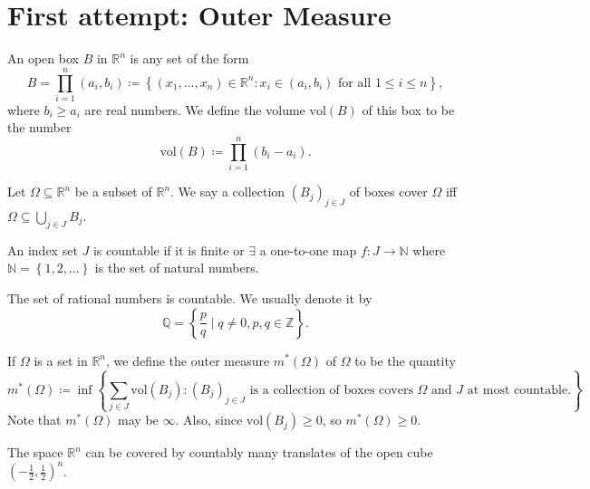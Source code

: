 \section{First attempt: Outer Measure}
\begin{definition}
    An open box \(B\) in \(\mathbb{R} ^n\) is any set of the form 
    \[
        B = \prod _{i=1}^n (a_i, b_i) \coloneqq \left\{ (x_1, \dots , x_n) \in \mathbb{R} ^n : x_i \in (a_i, b_i) \text{ for all } 1 \le i \le n  \right\},
    \]  
    where \(b_i \ge a_i\) are real numbers. We define the volume \(\mathrm{vol} (B) \) of this box to be the number 
    \[
        \mathrm{vol} (B) \coloneqq \prod _{i=1}^n (b_i - a_i). 
    \]   
\end{definition}

\begin{definition}
    Let \(\Omega \subseteq \mathbb{R} ^n\) be a subset of \(\mathbb{R} ^n\). We say a collection \((B_j)_{j \in J}\) of boxes cover \(\Omega \) iff \(\Omega \subseteq \bigcup_{j \in J} B_j \).    
\end{definition}

\begin{remark}
    An index set \(J\) is countable if it is finite or \(\exists \) a one-to-one map \(f: J \to \mathbb{N} \) where \(\mathbb{N} = \left\{ 1, 2, \dots  \right\} \) is the set of natural numbers.
\end{remark}

\begin{remark}
    The set of rational numbers is countable. We usually denote it by
    \[
        \mathbb{Q} = \left\{ \frac{p}{q} \mid q \neq 0, p, q \in \mathbb{Z}  \right\}. 
    \]
\end{remark}

\begin{definition}
    If \(\Omega \) is a set in \(\mathbb{R} ^n\), we define the outer measure \(m^* (\Omega )\) of \(\Omega \) to be the quantity 
    \[
        m^*(\Omega ) \coloneqq \inf \left\{ \sum_{j \in J} \mathrm{vol}(B_j): (B_j)_{j \in J} \text{ is a collection of boxes covers } \Omega \text{ and } J \text{ at most countable.}      \right\}. 
    \]    
    Note that \(m^*(\Omega )\) may be \(\infty \). Also, since \(\mathrm{vol} (B_j) \ge 0 \), so \(m^*(\Omega ) \ge 0\). 
\end{definition}

\begin{lemma}
    The space \(\mathbb{R} ^n\) can be covered by countably many translates of the open cube \(\left( -\frac{1}{2}, \frac{1}{2} \right)^n \). 
\end{lemma}

